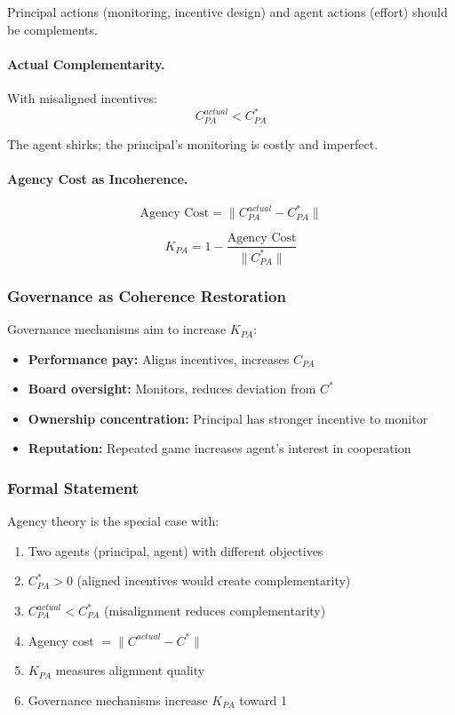 Principal actions (monitoring, incentive design) and agent actions (effort) 
should be complements.

\paragraph{Actual Complementarity.}
With misaligned incentives:
\begin{equation}
  C_{PA}^{actual} < C_{PA}^*
\end{equation}

The agent shirks; the principal's monitoring is costly and imperfect.

\paragraph{Agency Cost as Incoherence.}
\begin{equation}
  \text{Agency Cost} = \|C_{PA}^{actual} - C_{PA}^*\|
\end{equation}

\begin{equation}
  K_{PA} = 1 - \frac{\text{Agency Cost}}{\|C_{PA}^*\|}
\end{equation}

\subsubsection{Governance as Coherence Restoration}

Governance mechanisms aim to increase $K_{PA}$:
\begin{itemize}
  \item \textbf{Performance pay:} Aligns incentives, increases $C_{PA}$
  \item \textbf{Board oversight:} Monitors, reduces deviation from $C^*$
  \item \textbf{Ownership concentration:} Principal has stronger incentive to monitor
  \item \textbf{Reputation:} Repeated game increases agent's interest in cooperation
\end{itemize}

\subsubsection{Formal Statement}

\begin{proposition}
Agency theory is the special case with:
\begin{enumerate}
  \item Two agents (principal, agent) with different objectives
  \item $C_{PA}^* > 0$ (aligned incentives would create complementarity)
  \item $C_{PA}^{actual} < C_{PA}^*$ (misalignment reduces complementarity)
  \item Agency cost $= \|C^{actual} - C^*\|$
  \item $K_{PA}$ measures alignment quality
  \item Governance mechanisms increase $K_{PA}$ toward 1
\end{enumerate}
\end{proposition}

